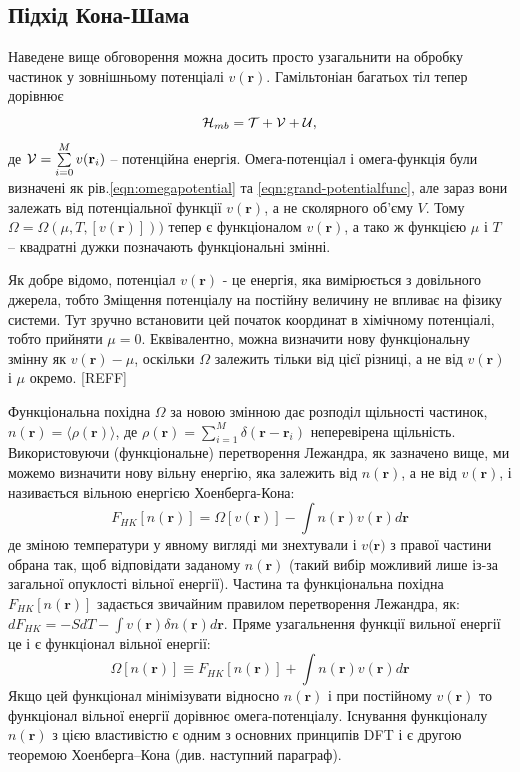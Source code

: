 \subsection{Підхід Кона-Шама}
Наведене вище обговорення можна досить просто узагальнити на обробку частинок у зовнішньому потенціалі $v(\textbf{r})$. Гамільтоніан багатьох тіл тепер дорівнює
\begin{equation}
\label{eqn:Ham}
	{\cal H}_{mb} = {\cal T} +{\cal V} +{\cal U},
\end{equation}
де ${\cal V} = \sum\limits_{i=0}^M v(\textbf{r}_i)$ -- потенційна енергія. Омега-потенціал і омега-функція були визначені як рів.\ref{eqn:omegapotential} та \ref{eqn:grand-potentialfunc}, але зараз вони залежать від потенціальної функції $v(\textbf{r})$, а не сколярного об'єму $V$. Тому $\Omega = \Omega(\mu, T, [v(\textbf{r})]))$ тепер є функціоналом $v(\textbf{r})$, а тако ж функцією $\mu$ і $T$ -- квадратні дужки позначають функціональні змінні. 

Як добре відомо, потенціал $v(\textbf{r})$ - це енергія, яка вимірюється з довільного джерела, тобто Зміщення потенціалу на постійну величину не впливає на фізику системи. Тут зручно встановити цей початок координат в хімічному потенціалі, тобто прийняти $\mu = 0$. Еквівалентно, можна визначити нову функціональну змінну як $v(\textbf{r}) - \mu$, оскільки $\Omega$ залежить тільки від цієї різниці, а не від $v(\textbf{r})$ і $\mu$ окремо. [REFF]

Функціональна похідна $\Omega$ за новою змінною дає розподіл щільності частинок, $n(\textbf{r}) = \langle \rho (\textbf{r}) \rangle$, де $\rho(\textbf{r}) = \sum\limits_{i=1}^M\delta(\textbf{r}-\textbf{r}_i)$ неперевірена щільність. Використовуючи (функціональне) перетворення Лежандра, як зазначено вище, ми можемо визначити нову вільну енергію, яка залежить від $n(\textbf{r})$, а не від $v(\textbf{r})$, і називається вільною енергією Хоенберга-Кона:
\begin{equation}
	\label{eqn:free_energ_hoenberg-khon}
	F_{HK}[n(\textbf{r})] = \Omega[v(\textbf{r})] - \int{n(\textbf{r}) v(\textbf{r})d\textbf{r}} 
\end{equation}
де зміною температури у явному вигляді ми знехтували і $v(\textbf{r)}$ з правої частини обрана так, щоб відповідати заданому $n(\textbf{r})$ (такий вибір можливий лише із-за загальної опуклості вільної енергії). Частина та функціональна похідна $F_{HK}[n(\textbf{r})]$ задається звичайним правилом перетворення Лежандра, як: $dF_{HK} = -SdT - \int{v(\textbf{r})\delta n(\textbf{r})d\textbf{r}}$.
Пряме узагальнення функції вильної енергії це і є функціонал вільної енергії:
\begin{equation}
	\label{eqn:free_energ_functional}
	\Omega[n(\textbf{r})] \equiv F_{HK}[n(\textbf{r})] + \int{n(\textbf{r})v(\textbf{r})d\textbf{r}}
\end{equation}
Якщо цей функціонал мінімізувати відносно $n(\textbf{r})$ і при постійному $v(\textbf{r})$ то функціонал вільної енергії дорівнює омега-потенціалу. Існування функціоналу $n(\textbf{r})$ з цією властивістю є одним з основних принципів DFT і є другою теоремою Хоенберга–Кона (див. наступний параграф).

